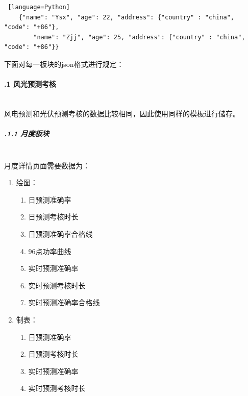 \documentclass[winfonts,UTF8,a4paper]{ctexart}
\begin{document}
\begin{lstlisting} [language=Python]
	{"name": "Ysx", "age": 22, "address": {"country" : "china", "code": "+86"},
		"name": "Zjj", "age": 25, "address": {"country" : "china", "code": "+86"}}
\end{lstlisting}

下面对每一板块的json格式进行规定：

\paragraph{\thesubsubsection.1 风光预测考核}\ \\
风电预测和光伏预测考核的数据比较相同，因此使用同样的模板进行储存。



\subparagraph{\thesubsubsection.1.1 月度板块}\label{momthjsonWind}\ \\
月度详情页面需要数据为：
\begin{enumerate}
	\item 绘图：
	\begin{enumerate}
		\item 日预测准确率
		\item 日预测考核时长
		\item 日预测准确率合格线
		\item 96点功率曲线
		\item 实时预测准确率
		\item 实时预测考核时长
		\item 实时预测准确率合格线
	\end{enumerate}
	\item 制表：
	\begin{enumerate}
		\item 日预测准确率
		\item 日预测考核时长
		\item 实时预测准确率
		\item 实时预测考核时长
	\end{enumerate}
\end{enumerate}
\end{document}
